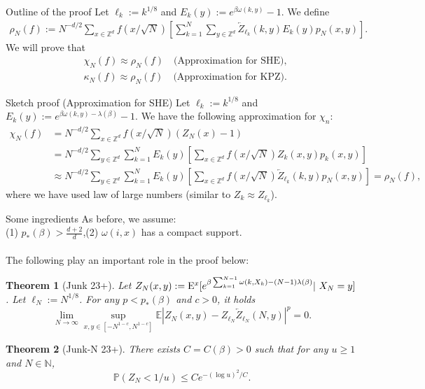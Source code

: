 \documentclass[10pt]{beamer}
\newtheorem{thm}{Theorem}
\newcommand{\N}{\mathbb{N}}
\newcommand{\E}{\mathbb{E}}
\newcommand{\Z}{\mathbb{Z}}
\def\al#1{\begin{align*}#1\end{align*}}
\begin{document}
\begin{frame}{Outline of the proof}
    Let $\ell_k:=k^{1/8}$ and $E_k(y):=e^{\beta \omega(k,y)}-1$. We define
    \al{
  \rho_N(f):=  N^{-d/2}\sum_{x\in \Z^d}f(x/\sqrt{N})\left[\sum_{k=1}^{N}  \sum_{y\in \Z^d}
\overleftarrow{Z}_{\ell_k}(k,y)E_k(y) p_N(x,y)\right].
    }
    We will prove that
    \al{
    &\chi_N(f)\approx \rho_N(f)\quad\text{(Approximation for SHE)},\\
    &\kappa_N(f)\approx \rho_N(f)\quad\text{(Approximation for KPZ)}.
        }
\end{frame}
\begin{frame}{Sketch  proof (Approximation for SHE)}
Let $\ell_k:=k^{1/8}$ and $E_k(y):=e^{\beta \omega(k,y)-\lambda(\beta)}-1$. We have the following approximation for $\chi_n$: 
\al{
\chi_N(f)&=N^{-d/2}\sum_{x\in \Z^d}f(x/\sqrt{N}) (Z_N(x)-1)\\
&= N^{-d/2}\sum_{y\in \Z^d}\sum_{k=1}^{N}E_k(y) \left[\sum_{x\in \Z^d}f(x/\sqrt{N}) Z_{k}(x,y) p_k(x,y)\right]\\
&\approx   N^{-d/2}\sum_{y\in \Z^d}\sum_{k=1}^{N} E_k(y)\left[\sum_{x\in \Z^d}f(x/\sqrt{N}) 
\overleftarrow{Z}_{\ell_k}(k,y)p_N(x,y)\right]=\rho_N(f),
}
where we have used law of large numbers (similar to $Z_k\approx Z_{\ell_k}$).
\end{frame}

\begin{frame}{Some ingredients}
    As before, we assume:\\
    (1) $p_*(\beta)>\frac{d+2}{d}$,\quad (2) $\omega(i,x)$ has a compact support.\\
    ~\\
    The following play an important role in the proof below:
\begin{thm}[Junk 23+]
  Let $Z_N(x,y):={\rm E}^x[e^{\beta\sum_{k=1}^{N-1}\omega(k,X_k)-(N-1)\lambda(\beta)}|~X_N=y]$. Let $\ell_N:=N^{1/8}$. For any $p<p_*(\beta)$ and $c>0$, it holds 
    $$\lim_{N\to\infty}\sup_{x,y\in [-N^{1-c},N^{1-c}]}\E|Z_N(x,y)-Z_{\ell_N} \overleftarrow{Z}_{\ell_N}(N,y)|^p=0.$$
\end{thm}
\begin{thm}[Junk-N 23+]\label{thm: lower tail concentration}
 There exists $C=C(\beta)>0$ such that for any $u\geq 1$ and $N\in\N$,
    $$\mathbb{P}(Z_{N}<1/u)\leq C e^{-(\log{u})^2/C}.$$
\end{thm}
\end{frame}
\end{document}
